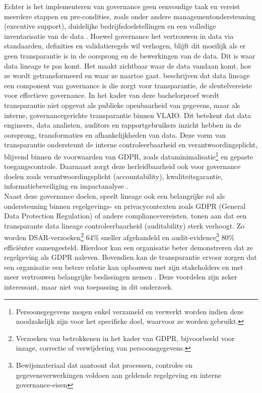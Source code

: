 Echter is het implementeren van governance geen eenvoudige taak en vereist meerdere stappen en pre-condities, zoals onder andere management\-ondersteuning (executive support), duidelijke bedrijfs\-doel\-stel\-lingen en een volledige inven\-tari\-satie van de data \autocite{verma2024tracing}. Hoewel governance het vertrouwen in data via standaarden, definities en validatieregels wil verhogen, blijft dit moeilijk als er geen transparantie is in de oorsprong en de bewerkingen van de data. Dit is waar data lineage te pas komt. Het maakt zichtbaar waar de data vandaan komt, hoe ze wordt getransformeerd en waar ze naartoe gaat. \textcite{verma2024tracing} beschrijven dat data lineage een component van governance is die zorgt voor transparantie, de sleutelvereiste voor effectieve governance. In het kader van deze bachelorproef wordt transparantie niet opgevat als publieke openbaarheid van gegevens, maar als interne, governancegerichte transparantie binnen VLAIO. Dit betekent dat data engineers, data analisten, auditors en rapportgebruikers inzicht hebben in de oorsprong, transformaties en afhankelijkheden van data. Deze vorm van transparantie ondersteunt de interne controleerbaarheid en verantwoordingsplicht, blijvend binnen de voorwaarden van GDPR, zoals dataminimalisatie\footnote{Persoonsgegevens mogen enkel verzameld en verwerkt worden indien deze noodzakelijk zijn voor het specifieke doel, waarvoor ze worden gebruikt.} en gepaste toegangscontrole. Daarnaast zorgt deze herleidbaarheid ook voor governance doelen zoals verantwoordingsplicht (accountability), kwaliteitsgarantie, informatiebeveiliging en impactanalyse \autocite{verma2024tracing}.\\

Naast deze governance doelen, speelt lineage ook een belangrijke rol als ondersteuning binnen regelgevings- en privacycontexten zoals GDPR (General Data Protection Regulation) of andere compliancevereisten. \textcite{malviya2025dbt} tonen aan dat een transparante data lineage controleerbaarheid (auditability) sterk verhoogt. Zo worden DSAR-verzoeken\footnote{Verzoeken van betrokkenen in het kader van GDPR, bijvoorbeeld voor inzage, correctie of verwijdering van persoonsgegevens.} 64\% sneller afgehandeld en audit-evidence\footnote{Bewijsmateriaal dat aantoont dat processen, controles en gegevensverwerkingen voldoen aan geldende regelgeving en interne governance-eisen} 80\% efficiënter samengesteld. Hierdoor kan een organisatie beter demonstreren dat ze regelgeving als GDPR naleven. Bovendien kan de transparantie ervoor zorgen dat een organisatie een betere relatie kan opbouwen met zijn stakeholders en met meer vertrouwen belangrijke beslissingen nemen \autocite{verma2024tracing}. Deze voordelen zijn zeker interessant, maar niet van toepassing in dit onderzoek.\\

